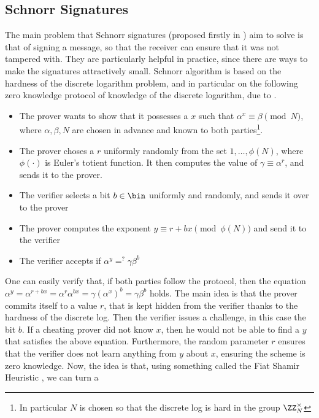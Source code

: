 \documentclass{article}
\begin{document}
\subsection{Schnorr Signatures}
The main problem that Schnorr signatures (proposed firstly in \cite{schnorrEfficientSignatureGeneration1991}) aim to 
solve is that of signing a message, so that the receiver can ensure that it was not tampered with. They are particularly
helpful in practice, since there are ways to make the signatures attractively small. Schnorr algorithm is based on the hardness
of the discrete logarithm problem, and in particular on the following zero knowledge protocol of knowledge of the 
discrete logarithm, due to \cite{chaumImprovedProtocolDemonstrating1988}.
\begin{itemize}
    \item The prover wants to show that it possesses a $x$ such that $\alpha^x \equiv \beta \pmod N$, where $\alpha, \beta, N$
          are chosen in advance and known to both parties\footnote{In particular $N$ is chosen so that the discrete log is hard in the group $\ZZ_N^\times$}.
    \item The prover choses a $r$ uniformly randomly from the set $1, \dots, \phi(N)$, where $\phi(\cdot)$ is Euler's
          totient function. It then computes the value of $\gamma \equiv \alpha^r$, and sends it to the prover.
    \item The verifier selects a bit $b \in \bin$ uniformly and randomly, and sends it over to the prover
    \item The prover computes the exponent $y \equiv r + bx \pmod{\phi(N)}$ and send it to the verifier
    \item The verifier accepts if $\alpha^y =^? \gamma \beta^b $
\end{itemize}
One can easily verify that, if both parties follow the protocol, then the equation 
$\alpha^y = \alpha^{r + bx} = \alpha^r \alpha^{bx} = \gamma (\alpha^x)^b = \gamma \beta^b$ holds. 
The main idea is that the prover commits itself to a value $r$, that is kept hidden from the verifier thanks to 
the hardness of the discrete log. Then the verifier issues a challenge, in this case the bit $b$. If a cheating prover
did not know $x$, then he would not be able to find a $y$ that satisfies the above equation. Furthermore, the random 
parameter $r$ ensures that the verifier does not learn anything from $y$ about $x$, ensuring the scheme is zero knowledge.
Now, the idea is that, using something called the Fiat Shamir Heuristic \cite{fiatHowProveYourself1987}, we can turn a 
\end{document}
